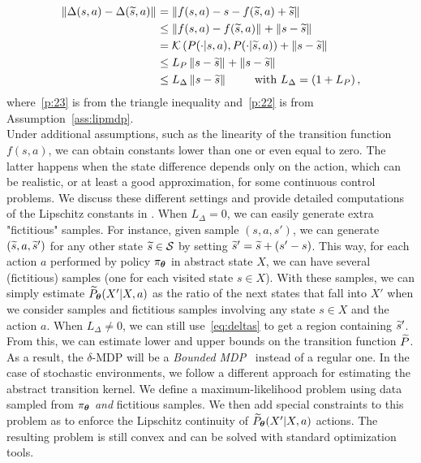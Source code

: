 \begin{align}
\left\|\Delta(s,a)-\Delta(\widetilde{s},a)\right\|_{} &=
\left\|f(s,a) - s - f(\widetilde{s},a) + \widetilde{s}\right\|_{} \nonumber\\
&\leq \left\|f(s,a)-f(\widetilde{s},a)\right\|_{} + \left\|s-\widetilde{s}\right\|_{} \label{p:23}\\
&= \mathcal{K}\left(P(\cdot|s,a), P(\cdot| \widetilde{s},a)\right) + \left\|s-\widetilde{s}\right\|_{} \nonumber\\
&\leq L_{P}\left\|s-\widetilde{s}\right\|_{} + \left\|s-\widetilde{s}\right\|_{} \label{p:22}\\
&\leq L_{\Delta} \left\|s-\widetilde{s}\right\|_{} \qquad \text{ with } L_{\Delta} = \left(1 + L_{P}\right), \label{p:18}
\end{align}
where~\eqref{p:23} is from the triangle inequality and~\eqref{p:22} is from Assumption~\ref{ass:lipmdp}.\\
\newline
Under additional assumptions, such as the linearity of the transition function $f(s,a)$, we can obtain constants lower than one or even equal to zero. The latter happens when the state difference depends only on the action, which can be realistic, or at least a good approximation, for some continuous control problems. We discuss these different settings and provide detailed computations of the Lipschitz constants in .
%
When $L_{\Delta}=0$, we can easily generate extra "fictitious" samples. For instance, given sample $(s,a,s')$, we can generate $(\widetilde{s},a,\widetilde{s}')$ for any other state $\widetilde{s}\in\mathcal{S}$ by setting $\widetilde{s}' = \widetilde{s} + (s'-s)$. This way, for each action $a$ performed by policy $\pi_{\boldsymbol{\theta}}$ in abstract state $X$, we can have several (fictitious) samples (one for each visited state $s\in X$). With these samples, we can simply estimate $\widetilde{P}_{\boldsymbol{\theta}}(X'|X,a)$ as the ratio of the next states that fall into $X'$ when we consider samples and fictitious samples involving any state $s \in X$ and the action $a$.
When $L_{\Delta}\neq 0$, we can still use~\eqref{eq:deltas} to get a region containing $\widetilde{s}'$.
From this, we can estimate lower and upper bounds on the transition function $\widetilde{P}$. As a result, the $\delta$-MDP will be a \textit{Bounded MDP}~\citep{givan2000bounded} instead of a regular one.
%
In the case of stochastic environments, we follow a different approach for estimating the abstract transition kernel. We define a maximum-likelihood problem using data sampled from $\pi_{\boldsymbol{\theta}}$ \textit{and} fictitious samples. We then add special constraints to this problem as to enforce the Lipschitz continuity of $\widetilde{P}_{\boldsymbol{\theta}}(X'|X,a)$ \wrt actions. The resulting problem is still convex and can be solved with standard optimization tools.
